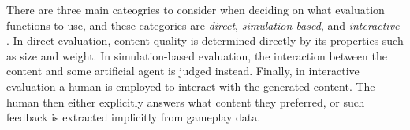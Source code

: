 There are three main cateogries to consider when deciding on what evaluation functions to use, and these categories are \textit{direct}, \textit{simulation-based}, and \textit{interactive} \cite[p.5-7]{search_based_pcg}.
In direct evaluation, content quality is determined directly by its properties such as size and weight.
In simulation-based evaluation, the interaction between the content and some artificial agent is judged instead.
Finally, in interactive evaluation a human is employed to interact with the generated content.
The human then either explicitly answers what content they preferred, or such feedback is extracted implicitly from gameplay data.

